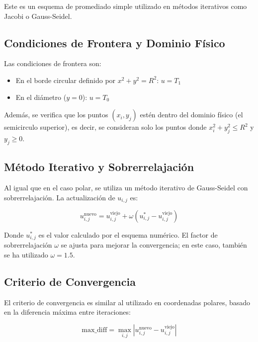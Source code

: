 Este es un esquema de promediado simple utilizado en métodos iterativos como Jacobi o Gauss-Seidel.

\subsection{Condiciones de Frontera y Dominio Físico}

Las condiciones de frontera son:

\begin{itemize} \item En el borde circular definido por $x^2 + y^2 = R^2$: $u = T_1$ \item En el diámetro ($y = 0$): $u = T_0$ \end{itemize}

Además, se verifica que los puntos $(x_i, y_j)$ estén dentro del dominio físico (el semicirculo superior), es decir, se consideran solo los puntos donde $x_i^2 + y_j^2 \leq R^2$ y $y_j \geq 0$.

\subsection{Método Iterativo y Sobrerrelajación}

Al igual que en el caso polar, se utiliza un método iterativo de Gauss-Seidel con sobrerrelajación. La actualización de $u_{i,j}$ es:

\begin{equation} u_{i,j}^{\text{nuevo}} = u_{i,j}^{\text{viejo}} + \omega \left( u_{i,j}^{*} - u_{i,j}^{\text{viejo}} \right) \end{equation}

Donde $u_{i,j}^{*}$ es el valor calculado por el esquema numérico. El factor de sobrerrelajación $\omega$ se ajusta para mejorar la convergencia; en este caso, también se ha utilizado $\omega = 1.5$.

\subsection{Criterio de Convergencia}

El criterio de convergencia es similar al utilizado en coordenadas polares, basado en la diferencia máxima entre iteraciones:

\begin{equation} \text{max\_diff} = \max_{i,j} \left| u_{i,j}^{\text{nuevo}} - u_{i,j}^{\text{viejo}} \right| \end{equation}


